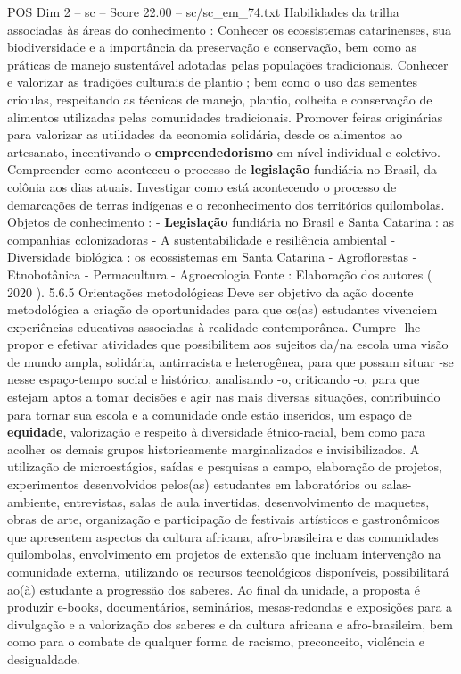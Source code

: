 \begin{textsample}{POS Dim 2 – sc – Score 22.00 – sc/sc\_em\_74.txt}
Habilidades da trilha associadas às áreas do conhecimento : Conhecer os ecossistemas catarinenses, sua biodiversidade e a importância da preservação e conservação, bem como as práticas de manejo sustentável adotadas pelas populações tradicionais.
Conhecer e valorizar as tradições culturais de plantio ; bem como o uso das sementes crioulas, respeitando as técnicas de manejo, plantio, colheita e conservação de alimentos utilizadas pelas comunidades tradicionais.
Promover feiras originárias para valorizar as utilidades da economia solidária, desde os alimentos ao artesanato, incentivando o \textbf{empreendedorismo} em nível individual e coletivo.
Compreender como aconteceu o processo de \textbf{legislação} fundiária no Brasil, da colônia aos dias atuais.
Investigar como está acontecendo o processo de demarcações de terras indígenas e o reconhecimento dos territórios quilombolas.
Objetos de conhecimento : - \textbf{Legislação} fundiária no Brasil e Santa Catarina : as companhias colonizadoras - A sustentabilidade e resiliência ambiental - Diversidade biológica : os ecossistemas em Santa Catarina - Agroflorestas - Etnobotânica - Permacultura - Agroecologia Fonte : Elaboração dos autores ( 2020 ). 5.6.5 Orientações metodológicas Deve ser objetivo da ação docente metodológica a criação de oportunidades para que os(as) estudantes vivenciem experiências educativas associadas à realidade contemporânea.
Cumpre -lhe propor e efetivar atividades que possibilitem aos sujeitos da/na escola uma visão de mundo ampla, solidária, antirracista e heterogênea, para que possam situar -se nesse espaço-tempo social e histórico, analisando -o, criticando -o, para que estejam aptos a tomar decisões e agir nas mais diversas situações, contribuindo para tornar sua escola e a comunidade onde estão inseridos, um espaço de \textbf{equidade}, valorização e respeito à diversidade étnico-racial, bem como para acolher os demais grupos historicamente marginalizados e invisibilizados.
A utilização de microestágios, saídas e pesquisas a campo, elaboração de projetos, experimentos desenvolvidos pelos(as) estudantes em laboratórios ou salas-ambiente, entrevistas, salas de aula invertidas, desenvolvimento de maquetes, obras de arte, organização e participação de festivais artísticos e gastronômicos que apresentem aspectos da cultura africana, afro-brasileira e das comunidades quilombolas, envolvimento em projetos de extensão que incluam intervenção na comunidade externa, utilizando os recursos tecnológicos disponíveis, possibilitará ao(à) estudante a progressão dos saberes.
Ao final da unidade, a proposta é produzir e-books, documentários, seminários, mesas-redondas e exposições para a divulgação e a valorização dos saberes e da cultura africana e afro-brasileira, bem como para o combate de qualquer forma de racismo, preconceito, violência e desigualdade.

\end{textsample}
